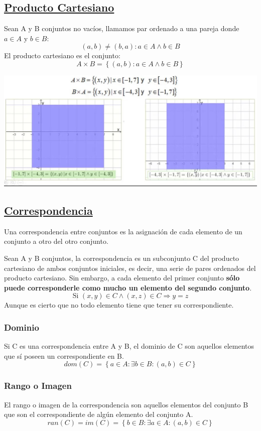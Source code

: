 \documentclass[10pt,a4paper,openright]{book}
\theoremstyle{break}
\begin{document}
\subsection{\underline{Producto Cartesiano}}
Sean A y B conjuntos no vacíos, llamamos par ordenado a una pareja donde $a \in A$ y $b \in B$:
$$(a,b)\neq (b,a) : a\in A \wedge b\in B$$
El producto cartesiano es el conjunto:
$$A\times B=\left\lbrace (a,b) : a \in A \wedge b \in B\right\rbrace$$

\begin{center}
\includegraphics[scale=0.5]{producto cartesiano}
\end{center}
 
\subsection{\underline{Correspondencia}}
Una correspondencia entre conjuntos es la asignación de cada elemento de un conjunto a otro del otro conjunto.\par
Sean A y B conjuntos, la correspondencia es un subconjunto C del producto cartesiano de ambos conjuntos iniciales, es decir, una serie de pares ordenados del producto cartesiano. Sin embargo, a cada elemento del primer conjunto \textbf{sólo puede corresponderle como mucho un elemento del segundo conjunto}.
$$\mbox{Si }(x,y) \in C\wedge (x,z)\in C\Rightarrow y=z$$
Aunque es cierto que no todo elemento tiene que tener su correspondiente.
\subsubsection{Dominio}
Si C es una correspondencia entre A y B, el dominio de C son aquellos elementos que sí poseen un correspondiente en B.
$$dom(C)=\left\lbrace a\in A : \exists b \in B : (a,b)\in C\right\rbrace$$
\subsubsection{Rango o Imagen}
El rango o imagen de la correspondencia son aquellos elementos del conjunto B que son el correspondiente de algún elemento del conjunto A.
$$ran(C)=im(C)=\left\lbrace b\in B : \exists a \in A : (a,b)\in C\right\rbrace$$
\end{document}
